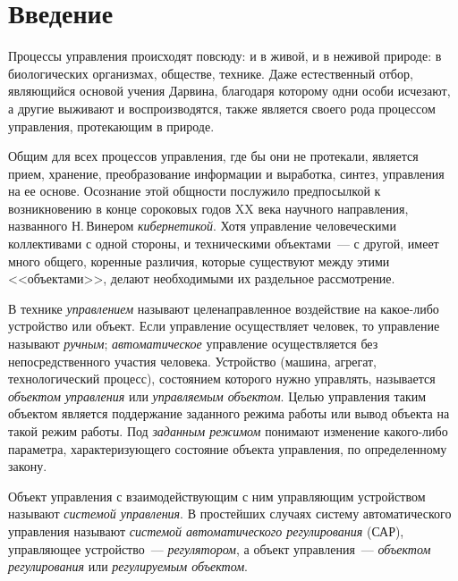 


\chapter*{Введение}



Процессы управления происходят повсюду: и в живой, и в неживой природе: в биологических организмах, обществе, технике. Даже естественный отбор, являющийся основой учения Дарвина, благодаря которому одни особи исчезают, а другие выживают и воспроизводятся, также является своего рода процессом управления, протекающим в природе.

Общим для всех процессов управления, где бы они не протекали, является прием, хранение, преобразование информации и выработка, синтез, управления на ее основе. Осознание этой общности послужило предпосылкой к возникновению в конце сороковых годов XX века научного направления, названного Н.\,Винером \emph{кибернетикой}. Хотя управление человеческими коллективами с одной стороны, и техническими объектами~--- с другой, имеет много общего, коренные различия, которые существуют между этими <<объектами>>, делают необходимыми их раздельное рассмотрение.

В технике \emph{управлением} называют целенаправленное воздействие на какое-либо устройство или объект. Если управление осуществляет человек, то управление называют \emph{ручным}; \emph{автоматическое} управление осуществляется без непосредственного участия человека. Устройство (машина, агрегат, технологический процесс), состоянием которого нужно управлять, называется \emph{объектом управления} или \emph{управляемым объектом}. Целью управления таким объектом является поддержание заданного режима работы или вывод объекта на такой режим работы. Под \emph{заданным режимом} понимают изменение какого-либо параметра, характеризующего состояние объекта управления, по определенному закону.

Объект управления с взаимодействующим с ним управляющим устройством называют \emph{системой управления}. В простейших случаях систему автоматического управления называют \emph{системой автоматического регулирования} (САР), управляющее устройство~--- \emph{регулятором}, а объект управления~--- \emph{объектом регулирования} или \emph{регулируемым объектом}.

